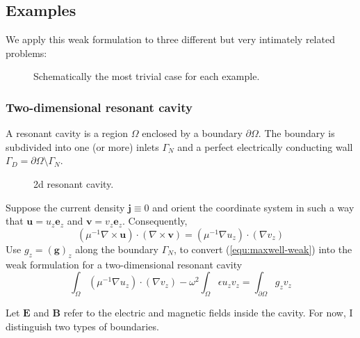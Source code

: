 \documentclass[11pt, a4paper]{article}
\begin{document}
\subsection{Examples}
\label{subsec:examples}

We apply this weak formulation to three different but very intimately related 
problems:

\begin{figure}[h]
    \centering
    
    \caption{Schematically the most trivial case for each example.}
    \label{fig:examples}
\end{figure}

\subsubsection{Two-dimensional resonant cavity}
\label{subsubsec:cavity}

A resonant cavity is a region $\Omega$ enclosed by a boundary $\partial \Omega$.
The boundary is subdivided into one (or more) inlets $\Gamma_N$ and a perfect
electrically conducting wall $\Gamma_D = \partial \Omega \setminus \Gamma_N$.

\begin{figure}[h]
    \centering
    
    \caption{2d resonant cavity.}
    \label{fig:2d-cavity}
\end{figure}

Suppose the current density $\mathbf{j} \equiv 0$ and orient the coordinate
system in such a way that $\mathbf{u} = u_z \mathbf{e}_z$ and 
$\mathbf{v} = v_z \mathbf{e}_z$. Consequently,
\begin{equation}
    (\mu^{-1} \nabla \times \mathbf{u}) \cdot (\nabla \times \mathbf{v})
    = (\mu^{-1} \nabla u_z) \cdot (\nabla v_z)
\end{equation}
Use $g_z = (\mathbf{g})_z$ along the boundary $\Gamma_N$,
to convert (\ref{equ:maxwell-weak}) into
the weak formulation for a two-dimensional resonant cavity
\begin{equation}
    \int_{\Omega} (\mu^{-1} \nabla u_z) \cdot (\nabla v_z)
    - \omega^2 \int_{\Omega} \epsilon u_z v_z
    = \int_{\partial \Omega} g_z v_z \label{equ:maxwell-weak-resonant-cavity}
\end{equation}

Let $\mathbf{E}$ and $\mathbf{B}$ refer to the electric and magnetic fields inside
the cavity. For now, I distinguish two types of boundaries.
\end{document}
